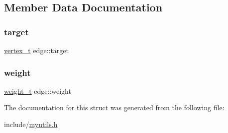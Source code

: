 \subsection{Member Data Documentation}
\mbox{\label{structedge_af8721d112f37e95c02f540569267848f}} 
\subsubsection{\texorpdfstring{target}{target}}
{\footnotesize\ttfamily \mbox{\hyperlink{_a_star_shortest_path_finder_8h_a12260dc5cde4dd7254dc16896f69e810}{vertex\+\_\+t}} edge\+::target}

\mbox{\label{structedge_ade75f8405f0967b5ff9231d522806be2}} 
\subsubsection{\texorpdfstring{weight}{weight}}
{\footnotesize\ttfamily \mbox{\hyperlink{myutils_8h_a4497881a7e75868dd6b1cafbffd81e1f}{weight\+\_\+t}} edge\+::weight}



The documentation for this struct was generated from the following file\+:\begin{DoxyCompactItemize}
\item 
include/\mbox{\hyperlink{myutils_8h}{myutils.\+h}}\end{DoxyCompactItemize}
